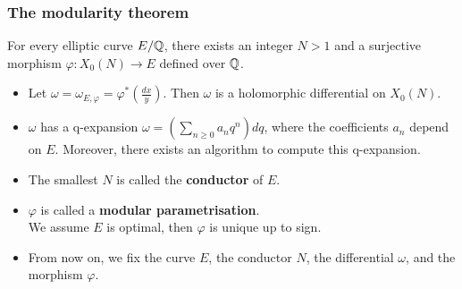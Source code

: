 \documentclass[handout]{beamer}
\begin{document}
\begin{frame}
\frametitle{The modularity theorem}


\begin{theorem}[Modularity]
For every elliptic curve $E/\mathbb{Q}$, there exists an integer $N > 1$ and a surjective morphism 
$\varphi: X_0(N) \to E$ defined over $\mathbb{Q}$.
\end{theorem}
\pause


\begin{itemize}
\item Let $\omega = \omega_{E, \varphi} = \varphi^*(\frac{dx}{y}) $. Then $\omega$ is a holomorphic differential on $X_0(N)$.

\pause

\item $\omega$ has a q-expansion $\omega = \left( \sum_{n \geq 0} a_n q^n \right) dq$, where the coefficients $a_n$ depend on $E$. Moreover, there exists an algorithm to compute 
this q-expansion.

\pause
\item The smallest $N$ is called the {\bf conductor} of $E$. 

\pause

\item $\varphi$ is called a {\bf modular parametrisation}. \\
We assume $E$ is optimal, then $\varphi$ is unique up to sign.

\pause 

\item From now on, we fix  the curve $E$, the conductor $N$, the differential $\omega$, and the morphism $\varphi$. 
\end{itemize}


\end{frame}
\end{document}
